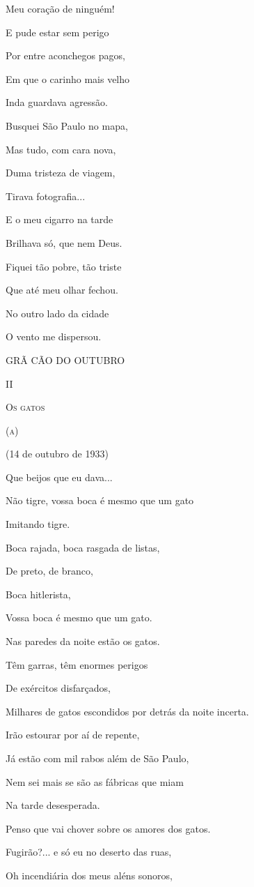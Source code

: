 Meu coração de ninguém!

E pude estar sem perigo

Por entre aconchegos pagos,

Em que o carinho mais velho

Inda guardava agressão.

Busquei São Paulo no mapa,

Mas tudo, com cara nova,

Duma tristeza de viagem,

Tirava fotografia...

E o meu cigarro na tarde

Brilhava só, que nem Deus.

Fiquei tão pobre, tão triste

Que até meu olhar fechou.

No outro lado da cidade

O vento me dispersou.

GRÃ CÃO DO OUTUBRO

II

\textsc{Os gatos}

\textsc{(a)}

(14 de outubro de 1933)

Que beijos que eu dava...

Não tigre, vossa boca é mesmo que um gato

Imitando tigre.

Boca rajada, boca rasgada de listas,

De preto, de branco,

Boca hitlerista,

Vossa boca é mesmo que um gato.

Nas paredes da noite estão os gatos.

Têm garras, têm enormes perigos

De exércitos disfarçados,

Milhares de gatos escondidos por detrás da noite incerta.

Irão estourar por aí de repente,

Já estão com mil rabos além de São Paulo,

Nem sei mais se são as fábricas que miam

Na tarde desesperada.

Penso que vai chover sobre os amores dos gatos.

Fugirão?... e só eu no deserto das ruas,

Oh incendiária dos meus aléns sonoros,

